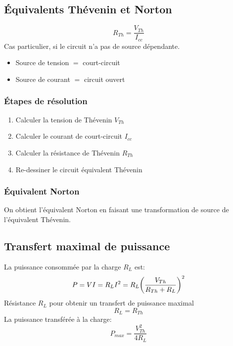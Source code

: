 \subsection{Équivalents Thévenin et Norton}
\begin{equation*}
    R_{Th}=\frac{V_{Th}}{I_{cc}}
\end{equation*}
Cas particulier, si le circuit n'a pas de source dépendante. 
\begin{itemize}[nosep]
    \item Source de tension $=$ court-circuit
    \item Source de courant $=$ circuit ouvert
\end{itemize}
\subsubsection{Étapes de résolution}
\begin{enumerate}[nosep]
    \item Calculer la tension de Thévenin $V_{Th}$
    \item Calculer le courant de court-circuit $I_{cc}$
    \item Calculer la résistance de Thévenin $R_{Th}$
    \item Re-dessiner le circuit équivalent Thévenin
\end{enumerate}

\subsubsection{Équivalent Norton}
On obtient l'équivalent Norton en faisant une transformation de source de l'équivalent Thévenin.


\subsection{Transfert maximal de puissance}
La puissance consommée par la charge $R_L$ est: 
\begin{equation*}
    P = VI = R_L I^2 = R_L \qty(\frac{V_{Th}}{R_{Th}+R_L})^2
\end{equation*}
Résistance $R_L$ pour obtenir un transfert de puissance maximal
\begin{equation*}
    R_L = R_{Th}
\end{equation*}
La puissance transférée à la charge:
\begin{equation*}
    P_{max} = \frac{V^2_{Th}}{4R_L}
\end{equation*}
